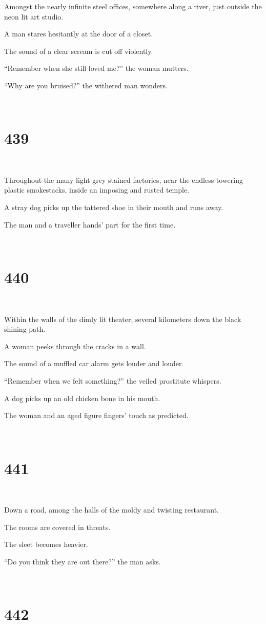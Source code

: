 \documentclass{report}
\begin{document}
Amongst the nearly infinite steel offices, somewhere along a river, just outside the neon lit art studio.

A man stares hesitantly at the door of a closet.

The sound of a clear scream is cut off violently.

``Remember when she still loved me?'' the woman mutters.

``Why are you bruised?'' the withered man wonders.

~
\chapter*{439}
~

Throughout the many light grey stained factories, near the endless towering plastic smokestacks, inside an imposing and rusted temple.

A stray dog picks up the tattered shoe in their mouth and runs away.

The man and a traveller hands' part for the first time.

~
\chapter*{440}
~

Within the walls of the dimly lit theater, several kilometers down the black shining path.

A woman peeks through the cracks in a wall.

The sound of a muffled car alarm gets louder and louder.

``Remember when we felt something?'' the veiled prostitute whispers.

A dog picks up an old chicken bone in his mouth.

The woman and an aged figure fingers' touch as predicted.

~
\chapter*{441}
~

Down a road, among the halls of the moldy and twisting restaurant.

The rooms are covered in threats.

The sleet becomes heavier.

``Do you think they are out there?'' the man asks.

~
\chapter*{442}
~
\end{document}
